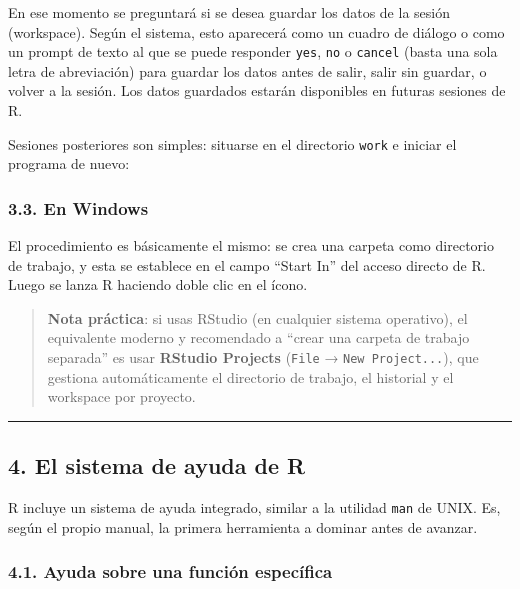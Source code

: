 \documentclass[
  jou,
  floatsintext,
  longtable,
  a4paper,
  nolmodern,
  notxfonts,
  notimes,
  12pt,
  colorlinks=true,linkcolor=blue,citecolor=blue,urlcolor=blue]{apa7}
\newenvironment{Shaded}{\begin{snugshade}}{\end{snugshade}}
\newcommand{\ExtensionTok}[1]{\textcolor[rgb]{0.00,0.23,0.31}{#1}}
\newcommand{\NormalTok}[1]{\textcolor[rgb]{0.00,0.23,0.31}{#1}}
\begin{document}
En ese momento se preguntará si se desea guardar los datos de la sesión
(workspace). Según el sistema, esto aparecerá como un cuadro de diálogo
o como un prompt de texto al que se puede responder \texttt{yes},
\texttt{no} o \texttt{cancel} (basta una sola letra de abreviación) para
guardar los datos antes de salir, salir sin guardar, o volver a la
sesión. Los datos guardados estarán disponibles en futuras sesiones de
R.

Sesiones posteriores son simples: situarse en el directorio
\texttt{work} e iniciar el programa de nuevo:

\begin{Shaded}
\end{Shaded}

\subsubsection{3.3. En Windows}\label{en-windows}

El procedimiento es básicamente el mismo: se crea una carpeta como
directorio de trabajo, y esta se establece en el campo ``Start In'' del
acceso directo de R. Luego se lanza R haciendo doble clic en el ícono.

\begin{quote}
\textbf{Nota práctica}: si usas RStudio (en cualquier sistema
operativo), el equivalente moderno y recomendado a ``crear una carpeta
de trabajo separada'' es usar \textbf{RStudio Projects} (\texttt{File} →
\texttt{New\ Project...}), que gestiona automáticamente el directorio de
trabajo, el historial y el workspace por proyecto.
\end{quote}

\begin{center}\rule{0.5\linewidth}{0.5pt}\end{center}

\subsection{4. El sistema de ayuda de R}\label{el-sistema-de-ayuda-de-r}

R incluye un sistema de ayuda integrado, similar a la utilidad
\texttt{man} de UNIX. Es, según el propio manual, la primera herramienta
a dominar antes de avanzar.

\subsubsection{4.1. Ayuda sobre una función
específica}\label{ayuda-sobre-una-funciuxf3n-especuxedfica}
\end{document}
